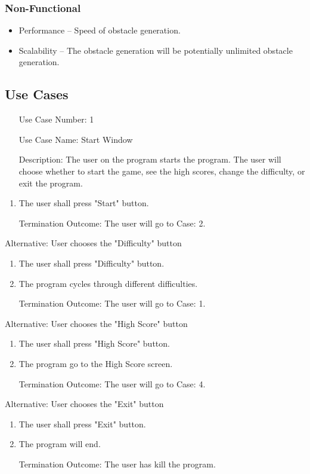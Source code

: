 \documentclass[10pt,conference,onecolumn,compsoc]{IEEEtran}
\begin{document}
\subsubsection{Non-Functional}
	\begin{itemize}
	\item Performance -- Speed of obstacle generation.
	\item Scalability -- The obstacle generation will be potentially unlimited obstacle generation.
	\end{itemize}

\subsection{Use Cases}

\begin{itemize}
\item[Use Case Number:] 1
\item[Use Case Name:] Start Window
\item[Description:] The user on the program starts the program. The user will choose whether to start the game, see the high scores, change the difficulty, or exit the program.
\end{itemize}
\begin{enumerate}
\item The user shall press "Start" button.
\item[Termination Outcome:] The user will go to Case: 2.
\end{enumerate}
Alternative: User chooses the "Difficulty" button
\begin{enumerate}
\item The user shall press "Difficulty" button.
\item The program cycles through different difficulties.
\item[Termination Outcome:] The user will go to Case: 1.
\end{enumerate}
Alternative: User chooses the "High Score" button
\begin{enumerate}
\item The user shall press "High Score" button.
\item The program go to the High Score screen.
\item[Termination Outcome:] The user will go to Case: 4.
\end{enumerate}
Alternative: User chooses the "Exit" button
\begin{enumerate}
\item The user shall press "Exit" button.
\item The program will end.
\item[Termination Outcome:] The user has kill the program.
\end{enumerate}
\end{document}
